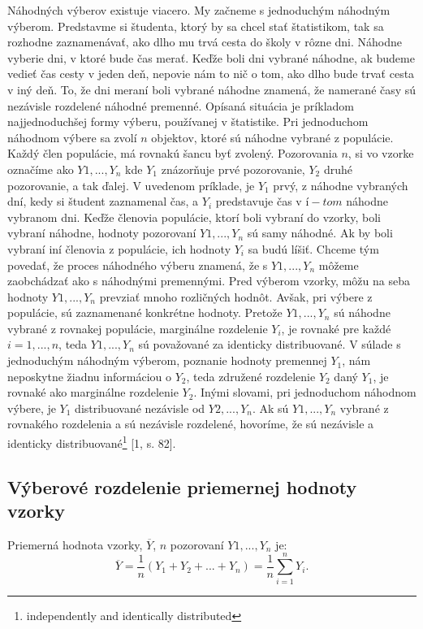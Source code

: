 \documentclass[]{tukediphc}
\begin{document}
Náhodných výberov existuje viacero. My začneme s jednoduchým náhodným výberom. Predstavme si študenta, ktorý by sa chcel stať štatistikom, tak sa rozhodne zaznamenávať, ako dlho mu trvá cesta do školy v rôzne dni. Náhodne vyberie dni, v ktoré bude čas merať. Keďže boli dni vybrané náhodne, ak budeme vedieť čas cesty v jeden deň, nepovie nám to nič o tom, ako dlho bude trvať cesta v iný deň. To, že dni meraní boli vybrané náhodne znamená, že namerané časy sú nezávisle rozdelené náhodné premenné. Opísaná situácia je príkladom najjednoduchšej formy výberu, používanej v štatistike. Pri jednoduchom náhodnom výbere sa zvolí $n$ objektov, ktoré sú náhodne vybrané z populácie. Každý člen populácie, má rovnakú šancu byť zvolený. Pozorovania $n$, si vo vzorke označíme ako $Y1, ..., Y_n$ kde $Y_1$ znázorňuje prvé pozorovanie, $Y_2$ druhé pozorovanie, a tak ďalej. V uvedenom príklade, je $Y_1$ prvý, z náhodne vybraných dní, kedy si študent zaznamenal čas, a $Y_i$ predstavuje čas v $í-tom$ náhodne vybranom dni. 
Keďže členovia populácie, ktorí boli vybraní do vzorky, boli vybraní náhodne, hodnoty pozorovaní $Y1, ..., Y_n$ sú samy náhodné. Ak by boli vybraní iní členovia z populácie, ich hodnoty $Y_i$ sa budú líšiť. Chceme tým povedať, že proces náhodného výberu znamená, že s $Y1, ..., Y_n$ môžeme zaobchádzať ako s náhodnými premennými. Pred výberom vzorky, môžu na seba hodnoty $Y1, ..., Y_n$ prevziať mnoho rozličných hodnôt. Avšak, pri výbere z populácie, sú zaznamenané konkrétne hodnoty. Pretože $Y1, ..., Y_n$ sú náhodne vybrané z rovnakej populácie, marginálne rozdelenie $Y_i$, je rovnaké pre každé $i = 1, ..., n$, teda $Y1, ..., Y_n$ sú považované za identicky distribuované. V súlade s jednoduchým náhodným výberom, poznanie hodnoty premennej $Y_1$, nám neposkytne žiadnu informáciou o $Y_2$, teda združené rozdelenie $Y_2$ daný $Y_1$, je rovnaké ako marginálne rozdelenie $Y_2$. Inými slovami, pri jednoduchom náhodnom výbere, je $Y_1$ distribuované nezávisle od $Y2, ..., Y_n$. 
Ak sú $Y1, ..., Y_n$ vybrané z rovnakého rozdelenia a sú nezávisle rozdelené, hovoríme, že sú nezávisle a identicky distribuované\footnote{independently and identically distributed} [1, s. 82].

\subsection{Výberové rozdelenie priemernej hodnoty vzorky}

Priemerná hodnota vzorky, $\overline{Y}$, $n$ pozorovaní $Y1, ..., Y_n$ je:
\begin{equation}
\overline{Y} = \frac{1}{n}(Y_1 + Y_2 + ... + Y_n)=\frac{1}{n}\sum_{i=1}^{n}Y_i.
\end{equation}
\end{document}

